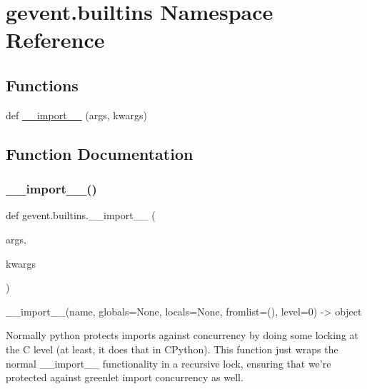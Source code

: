 \hypertarget{namespacegevent_1_1builtins}{}\section{gevent.\+builtins Namespace Reference}
\label{namespacegevent_1_1builtins}
\subsection*{Functions}
\begin{DoxyCompactItemize}
\item 
def \hyperlink{namespacegevent_1_1builtins_af9e9a3f875b6ad49130df523300bc561}{\+\_\+\+\_\+import\+\_\+\+\_\+} (args, kwargs)
\end{DoxyCompactItemize}


\subsection{Function Documentation}
\mbox{\label{namespacegevent_1_1builtins_af9e9a3f875b6ad49130df523300bc561}} 
\subsubsection{\texorpdfstring{\+\_\+\+\_\+import\+\_\+\+\_\+()}{\_\_import\_\_()}}
{\footnotesize\ttfamily def gevent.\+builtins.\+\_\+\+\_\+import\+\_\+\+\_\+ (\begin{DoxyParamCaption}\item[{}]{args,  }\item[{}]{kwargs }\end{DoxyParamCaption})}

\begin{DoxyVerb}__import__(name, globals=None, locals=None, fromlist=(), level=0) -> object

Normally python protects imports against concurrency by doing some locking
at the C level (at least, it does that in CPython).  This function just
wraps the normal __import__ functionality in a recursive lock, ensuring that
we're protected against greenlet import concurrency as well.
\end{DoxyVerb}
 